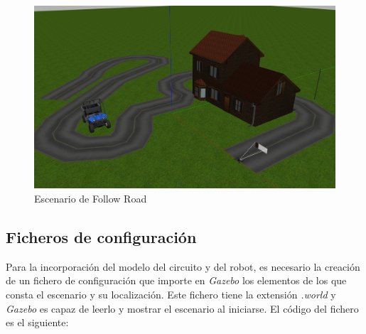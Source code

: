 \begin{figure}[H]
  \begin{center}
    \includegraphics[width=0.7\linewidth]{figures/mundo_fr.png}
		\caption{Escenario de Follow Road}
		\label{fig.mundo_fr}
		\end{center}
\end{figure}

\subsection{Ficheros de configuración} \label{sec.launch_fr}
Para la incorporación del modelo del circuito y del robot, es necesario la creación de un fichero de configuración que importe en \textit{Gazebo} los elementos de los que consta el escenario y su localización. Este fichero tiene la extensión \textit{.world} y \textit{Gazebo} es capaz de leerlo y mostrar el escenario al iniciarse.
El código del fichero es el siguiente:

